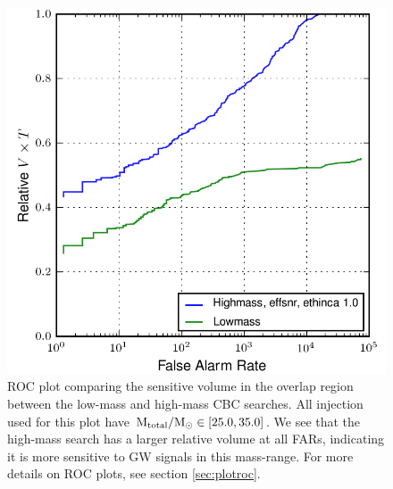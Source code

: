 \begin{figure}[p]
\center
\label{fig:mass_investigation-plotroc}
\includegraphics[width=5in]{figures/lower_tmpltbank_investigation/overlap_allinj_ROC.png}
\caption{ROC plot comparing the sensitive volume in the overlap region between
the low-mass and high-mass \ac{CBC} searches. All injection used for this plot
have $\mathrm{M_{total}}/\mathrm{M_\odot} \in [25.0, 35.0]$. We see that the high-mass search has a
larger relative volume at all FARs, indicating it is more sensitive to GW
signals in this mass-range. For more details on ROC plots, see section
\ref{sec:plotroc}.}
\end{figure}

